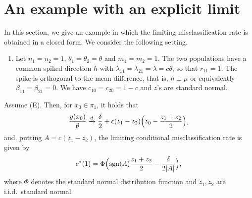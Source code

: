 \section{An example with an explicit limit}
\label{sec:example}

In this section, we give an example in which the limiting misclassification rate is
obtained in a closed form. We consider the following setting.

\begin{enumerate}[label=(E),leftmargin=*]
\item Let $n_1=n_2=1$, $\theta_1=\theta_2=\theta$ and $m_1=m_2=1$. The two
populations have a common spiked direction $h$ with
$\lambda_{11}=\lambda_{21}=\lambda=c\theta$, so that $r_{11}=1$. The spike is
orthogonal to the mean difference, that is, $h\perp\mu$ or equivalently
$\beta_{11}=\beta_{21}=0$. We have $c_{10}=c_{20}=1-c$ and $z$'s are standard
normal.
\end{enumerate}

\begin{theorem}
\label{thm:4}
Assume \textup{(E)}. Then, for $x_0\in\pi_1$, it holds that
\begin{equation}
\frac{y(x_0)}{\theta}
\xrightarrow{d}
\frac{\delta}{2}+c(z_1-z_2)\Bigl(z_0-\frac{z_1+z_2}{2}\Bigr),
\label{eq:7.1}
\end{equation}
and, putting $A=c(z_1-z_2)$, the limiting conditional misclassification rate is
given by
\begin{equation}
e^*(1)=\Phi\Bigl(\operatorname{sgn}(A)\frac{z_1+z_2}{2}-\frac{\delta}{2|A|}\Bigr),
\label{eq:7.2}
\end{equation}
where $\Phi$ denotes the standard normal distribution function and $z_1,z_2$ are
i.i.d.\ standard normal.
\end{theorem}

